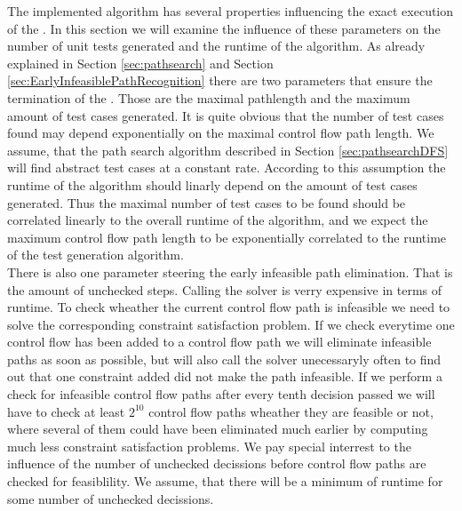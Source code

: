 The implemented algorithm has several properties influencing the exact execution of the . In this section we will examine the influence of these parameters on the number of unit tests generated and the runtime of the algorithm. As already explained in Section \ref{sec:pathsearch} and Section \ref{sec:EarlyInfeasiblePathRecognition} there are two parameters that ensure the termination of the . Those are the maximal pathlength and the maximum amount of test cases generated. It is quite obvious that the number of test cases found may depend exponentially on the maximal control flow path length. We assume, that the path search algorithm described in Section \ref{sec:pathsearchDFS} will find abstract test cases at a constant rate. According to this assumption the runtime of the algorithm should linarly depend on the amount of test cases generated. Thus the maximal number of test cases to be found should be correlated linearly to the overall runtime of the algorithm, and we expect the maximum control flow path length to be exponentially correlated to the runtime of the test generation algorithm. \\
There is also one parameter steering the early infeasible path elimination. That is the amount of unchecked steps. Calling the solver is verry expensive in terms of runtime. To check wheather the current control flow path is infeasible we need to solve the corresponding constraint satisfaction problem. If we check everytime one control flow has been added to a control flow path we will eliminate infeasible paths as soon as possible, but will also call the solver unecessaryly often to find out that one constraint added did not make the path infeasible. If we perform a check for infeasible control flow paths after every tenth decision passed we will have to check at least $2^10$ control flow paths wheather they are feasible or not, where several of them could have been eliminated much earlier by computing much less constraint satisfaction problems. We pay special interrest to the influence of the number of unchecked decissions before control flow paths are checked for feasiblility. We assume, that there will be a minimum of runtime for some number of unchecked decissions.





